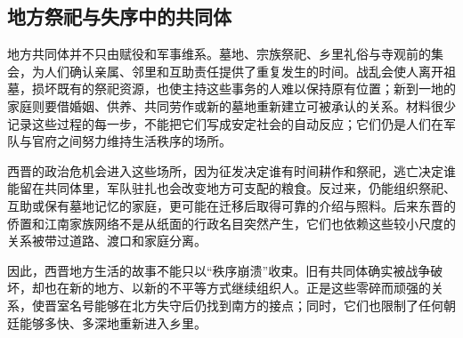 \subsection{地方祭祀与失序中的共同体}

地方共同体并不只由赋役和军事维系。墓地、宗族祭祀、乡里礼俗与寺观前的集会，为人们确认亲属、邻里和互助责任提供了重复发生的时间。战乱会使人离开祖墓，损坏既有的祭祀资源，也使主持这些事务的人难以保持原有位置；新到一地的家庭则要借婚姻、供养、共同劳作或新的墓地重新建立可被承认的关系。材料很少记录这些过程的每一步，不能把它们写成安定社会的自动反应；它们仍是人们在军队与官府之间努力维持生活秩序的场所。

西晋的政治危机会进入这些场所，因为征发决定谁有时间耕作和祭祀，逃亡决定谁能留在共同体里，军队驻扎也会改变地方可支配的粮食。反过来，仍能组织祭祀、互助或保有墓地记忆的家庭，更可能在迁移后取得可靠的介绍与照料。后来东晋的侨置和江南家族网络不是从纸面的行政名目突然产生，它们也依赖这些较小尺度的关系被带过道路、渡口和家庭分离。

因此，西晋地方生活的故事不能只以“秩序崩溃”收束。旧有共同体确实被战争破坏，却也在新的地方、以新的不平等方式继续组织人。正是这些零碎而顽强的关系，使晋室名号能够在北方失守后仍找到南方的接点；同时，它们也限制了任何朝廷能够多快、多深地重新进入乡里。
